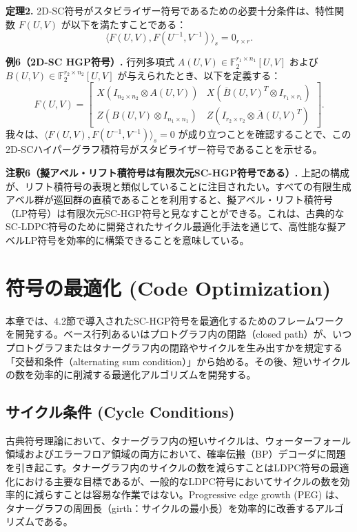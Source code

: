 \documentclass[a4paper,11pt]{article}
\begin{document}
\textbf{定理2.} 2D-SC符号がスタビライザー符号であるための必要十分条件は、特性関数 $F(U,V)$ が以下を満たすことである：
\begin{equation}
\langle F(U,V), F(U^{-1}, V^{-1}) \rangle_s = 0_{r \times r}. \label{eq:thm2_cond}
\end{equation}

\noindent \textbf{例6（2D-SC HGP符号）.}
行列多項式 $A(U,V) \in \mathbb{F}_2^{r_1 \times n_1}[U,V]$ および $B(U,V) \in \mathbb{F}_2^{r_2 \times n_2}[U,V]$ が与えられたとき、以下を定義する：
\begin{equation}
F(U,V) = \begin{bmatrix} X(I_{n_2 \times n_2} \otimes A(U,V)) & X(\overline{B}(U,V)^T \otimes I_{r_1 \times r_1}) \\ Z(B(U,V) \otimes I_{n_1 \times n_1}) & Z(I_{r_2 \times r_2} \otimes \overline{A}(U,V)^T) \end{bmatrix}.
\end{equation}
我々は、$\langle F(U,V), F(U^{-1}, V^{-1}) \rangle_s = 0$ が成り立つことを確認することで、この2D-SCハイパーグラフ積符号がスタビライザー符号であることを示せる。

\noindent \textbf{注釈6（擬アベル・リフト積符号は有限次元SC-HGP符号である）.} 
上記の構成が、リフト積符号の表現と類似していることに注目されたい。すべての有限生成アベル群が巡回群の直積であることを利用すると、擬アベル・リフト積符号（LP符号）は有限次元SC-HGP符号と見なすことができる。これは、古典的なSC-LDPC符号のために開発されたサイクル最適化手法を通じて、高性能な擬アベルLP符号を効率的に構築できることを意味している。

\section{符号の最適化 (Code Optimization)}
本章では、4.2節で導入されたSC-HGP符号を最適化するためのフレームワークを開発する。ベース行列あるいはプロトグラフ内の閉路（closed path）が、いつプロトグラフまたはタナーグラフ内の閉路やサイクルを生み出すかを規定する「交替和条件（alternating sum condition）」から始める。その後、短いサイクルの数を効率的に削減する最適化アルゴリズムを開発する。

\subsection{サイクル条件 (Cycle Conditions)}
古典符号理論において、タナーグラフ内の短いサイクルは、ウォーターフォール領域およびエラーフロア領域の両方において、確率伝搬（BP）デコーダに問題を引き起こす。タナーグラフ内のサイクルの数を減らすことはLDPC符号の最適化における主要な目標であるが、一般的なLDPC符号においてサイクルの数を効率的に減らすことは容易な作業ではない。Progressive edge growth (PEG) は、タナーグラフの周囲長（girth：サイクルの最小長）を効率的に改善するアルゴリズムである。
\end{document}
